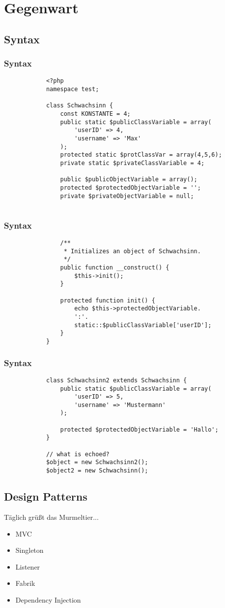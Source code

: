 \documentclass{beamer}
\begin{document}
	\section{Gegenwart}
	\subsection{Syntax}
	\begin{frame}[fragile]
		\frametitle{Syntax}
		\begin{lstlisting}
			<?php
			namespace test;
			
			class Schwachsinn {
			    const KONSTANTE = 4;
			    public static $publicClassVariable = array(
			        'userID' => 4,
			        'username' => 'Max'
			    );
			    protected static $protClassVar = array(4,5,6);
			    private static $privateClassVariable = 4;
			    
			    public $publicObjectVariable = array();
			    protected $protectedObjectVariable = '';
			    private $privateObjectVariable = null;
			    
		\end{lstlisting}
	\end{frame}
	\begin{frame}[fragile]
		\frametitle{Syntax}
		\begin{lstlisting}	    
			    /**
			     * Initializes an object of Schwachsinn.
			     */
			    public function __construct() {
			        $this->init();
			    }
			    
			    protected function init() {
			        echo $this->protectedObjectVariable.
			        ':'.
			        static::$publicClassVariable['userID'];
			    }
			}
		\end{lstlisting}
	\end{frame}
	
	\begin{frame}[fragile]
		\frametitle{Syntax}
		\begin{lstlisting}
			class Schwachsinn2 extends Schwachsinn {
			    public static $publicClassVariable = array(
			        'userID' => 5,
			        'username' => 'Mustermann'
			    );
			    
			    protected $protectedObjectVariable = 'Hallo';
			}
			
			// what is echoed?
			$object = new Schwachsinn2();
			$object2 = new Schwachsinn();
		\end{lstlisting}
	\end{frame}
	
	\subsection{Design Patterns}
	\begin{frame}{Täglich grüßt das Murmeltier...}
		\begin{itemize}
			\item<2-> MVC
			\item<3-> Singleton
			\item<4-> Listener
			\item<5-> Fabrik
			\item<6-> Dependency Injection
		\end{itemize}
	\end{frame}
\end{document}
